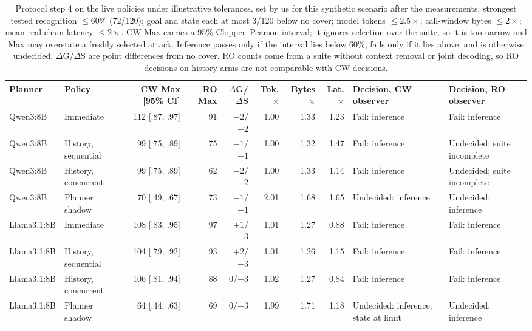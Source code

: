 \begin{table}[t]\centering\footnotesize
\caption{Protocol step 4 on the live policies under illustrative tolerances, set by us for this synthetic scenario after the measurements: strongest tested recognition $\le 60\%$ (72/120); goal and state each at most 3/120 below no cover; model tokens $\le2.5\times$; call-window bytes $\le2\times$; mean real-chain latency $\le2\times$. CW Max carries a 95\% Clopper--Pearson interval; it ignores selection over the suite, so it is too narrow and Max may overstate a freshly selected attack. Inference passes only if the interval lies below 60\%, fails only if it lies above, and is otherwise undecided. $\Delta$G/$\Delta$S are point differences from no cover. RO counts come from a suite without context removal or joint decoding, so RO decisions on history arms are not comparable with CW decisions.}\label{tab:decision}
\setlength{\tabcolsep}{3pt}
\begin{tabularx}{\textwidth}{@{}llrrrrrrYY@{}}\toprule
Planner & Policy & CW Max [95\% CI] & RO Max & $\Delta$G/$\Delta$S & Tok.$\times$ & Bytes$\times$ & Lat.$\times$ & Decision, CW observer & Decision, RO observer \\\midrule
Qwen3:8B & Immediate & 112 [.87, .97] & 91 & $-2$/$-2$ & 1.00 & 1.33 & 1.23 & Fail: inference & Fail: inference \\
Qwen3:8B & History, sequential & 99 [.75, .89] & 75 & $-1$/$-1$ & 1.00 & 1.32 & 1.47 & Fail: inference & Undecided; suite incomplete \\
Qwen3:8B & History, concurrent & 99 [.75, .89] & 62 & $-2$/$-2$ & 1.00 & 1.33 & 1.14 & Fail: inference & Undecided; suite incomplete \\
Qwen3:8B & Planner shadow & 70 [.49, .67] & 73 & $-1$/$-1$ & 2.01 & 1.68 & 1.65 & Undecided: inference & Undecided: inference \\\midrule
Llama3.1:8B & Immediate & 108 [.83, .95] & 97 & $+1$/$-3$ & 1.01 & 1.27 & 0.88 & Fail: inference & Fail: inference \\
Llama3.1:8B & History, sequential & 104 [.79, .92] & 93 & $+2$/$-3$ & 1.01 & 1.26 & 1.15 & Fail: inference & Fail: inference \\
Llama3.1:8B & History, concurrent & 106 [.81, .94] & 88 & $0$/$-3$ & 1.02 & 1.27 & 0.84 & Fail: inference & Fail: inference \\
Llama3.1:8B & Planner shadow & 64 [.44, .63] & 69 & $0$/$-3$ & 1.99 & 1.71 & 1.18 & Undecided: inference; state at limit & Undecided: inference \\\bottomrule
\end{tabularx}\end{table}
